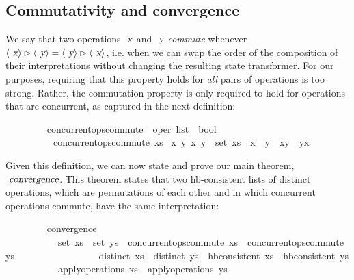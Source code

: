 \subsection{Commutativity and convergence}\label{sect.ops.commute}

We say that two operations $\isa{x}$ and $\isa{y}$ \emph{commute} whenever $\langle\isa{x}\rangle \mathbin{\isasymrhd} \langle\isa{y}\rangle = \langle\isa{y}\rangle \mathbin{\isasymrhd} \langle\isa{x}\rangle$, i.e. when we can swap the order of the composition of their interpretations without changing the resulting state transformer.
For our purposes, requiring that this property holds for \emph{all} pairs of operations is too strong.
Rather, the commutation property is only required to hold for operations that are concurrent, as captured in the next definition:
\vspace{0.35em}
\begin{isabellebody}
\ \ \ \ \ \ \ \  concurrent{\isacharunderscore}ops{\isacharunderscore}commute\ {\isacharcolon}{\isacharcolon}\ {\isachardoublequoteopen}{\isacharprime}oper\ list\ {\isasymRightarrow}\ bool{\isachardoublequoteclose}\ \isanewline
\ \ \ \ \ \ \ \ \ \ {\isachardoublequoteopen}concurrent{\isacharunderscore}ops{\isacharunderscore}commute\ xs\ {\isasymequiv} {\isasymforall}x\ y{\isachardot}\ {\isacharbraceleft}x{\isacharcomma}\ y{\isacharbraceright}\ {\isasymsubseteq}\ set\ xs\ {\isasymlongrightarrow}\ x\ {\isasymparallel}\ y\ {\isasymlongrightarrow}\ {\isasymlangle}x{\isasymrangle}{\isasymrhd}{\isasymlangle}y{\isasymrangle}\ {\isacharequal}\ {\isasymlangle}y{\isasymrangle}{\isasymrhd}{\isasymlangle}x{\isasymrangle}{\isachardoublequoteclose}
\end{isabellebody}
\vspace{0.35em}
Given this definition, we can now state and prove our main theorem, $\isa{convergence}$.
This theorem states that two hb-consistent lists of distinct operations, which are permutations of each other and in which concurrent operations commute, have the same interpretation:
\vspace{0.35em}
\begin{isabellebody}
\ \ \ \ \ \ \ \  convergence{\isacharcolon}\isanewline
\ \ \ \ \ \ \ \ \ \ \ {\isachardoublequoteopen}set\ xs\ {\isacharequal}\ set\ ys{\isachardoublequoteclose}\ \ {\isachardoublequoteopen}concurrent{\isacharunderscore}ops{\isacharunderscore}commute\ xs{\isachardoublequoteclose}\ \ {\isachardoublequoteopen}concurrent{\isacharunderscore}ops{\isacharunderscore}commute\ ys{\isachardoublequoteclose}\isanewline
\ \ \ \ \ \ \ \ \ \ \ \ \ \ \ \ \ {\isachardoublequoteopen}distinct\ xs{\isachardoublequoteclose}\ \ {\isachardoublequoteopen}distinct\ ys{\isachardoublequoteclose}\ \ {\isachardoublequoteopen}hb{\isacharunderscore}consistent\ xs{\isachardoublequoteclose}\ \ {\isachardoublequoteopen}hb{\isacharunderscore}consistent\ ys{\isachardoublequoteclose}\isanewline
\ \ \ \ \ \ \ \ \ \ \ {\isachardoublequoteopen}apply{\isacharunderscore}operations\ xs\ {\isacharequal}\ apply{\isacharunderscore}operations\ ys{\isachardoublequoteclose}
\end{isabellebody}
